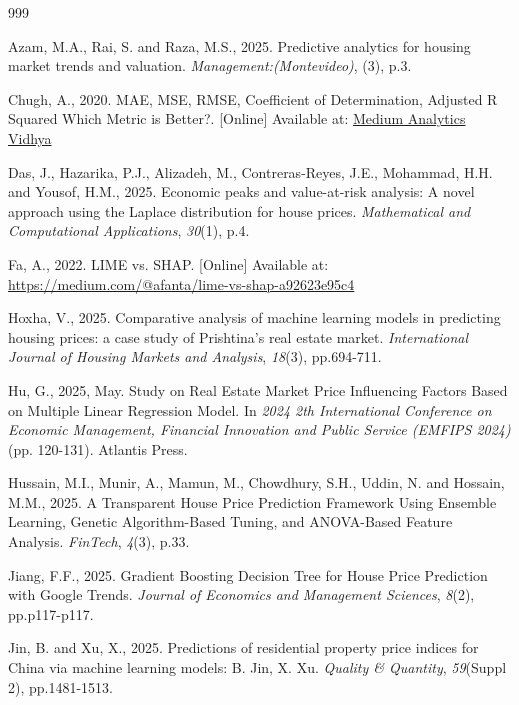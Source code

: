 \documentclass[12pt, a4paper, oneside]{book}
\begin{document}
\renewcommand{\bibname}{References}
\begin{thebibliography}{999}

Azam, M.A., Rai, S. and Raza, M.S., 2025. Predictive analytics for housing market trends and valuation. \emph{Management:(Montevideo)}, (3), p.3.

Chugh, A., 2020. MAE, MSE, RMSE, Coefficient of Determination, Adjusted R Squared Which Metric is Better?. [Online] Available at: 
\href{https://medium.com/analytics-vidhya/mae-mse-rmse-coefficient-of-determination-adjusted-r-squared-which-metric-is-better-cd0326a5697e}{Medium Analytics Vidhya}

Das, J., Hazarika, P.J., Alizadeh, M., Contreras-Reyes, J.E., Mohammad, H.H. and Yousof, H.M., 2025. Economic peaks and value-at-risk analysis: A novel approach using the Laplace distribution for house prices. \emph{Mathematical and Computational Applications}, \emph{30}(1), p.4.

Fa, A., 2022. LIME vs. SHAP. [Online] Available at: \url{https://medium.com/@afanta/lime-vs-shap-a92623e95c4}

Hoxha, V., 2025. Comparative analysis of machine learning models in predicting housing prices: a case study of Prishtina's real estate market. \emph{International Journal of Housing Markets and Analysis}, \emph{18}(3), pp.694-711.

Hu, G., 2025, May. Study on Real Estate Market Price Influencing Factors Based on Multiple Linear Regression Model. In \emph{2024 2th International Conference on Economic Management, Financial Innovation and Public Service (EMFIPS 2024)} (pp. 120-131). Atlantis Press.

Hussain, M.I., Munir, A., Mamun, M., Chowdhury, S.H., Uddin, N. and Hossain, M.M., 2025. A Transparent House Price Prediction Framework Using Ensemble Learning, Genetic Algorithm-Based Tuning, and ANOVA-Based Feature Analysis. \emph{FinTech}, \emph{4}(3), p.33.

Jiang, F.F., 2025. Gradient Boosting Decision Tree for House Price Prediction with Google Trends. \emph{Journal of Economics and Management Sciences}, \emph{8}(2), pp.p117-p117.

Jin, B. and Xu, X., 2025. Predictions of residential property price indices for China via machine learning models: B. Jin, X. Xu. \emph{Quality \& Quantity}, \emph{59}(Suppl 2), pp.1481-1513.


\end{thebibliography}
\end{document}
